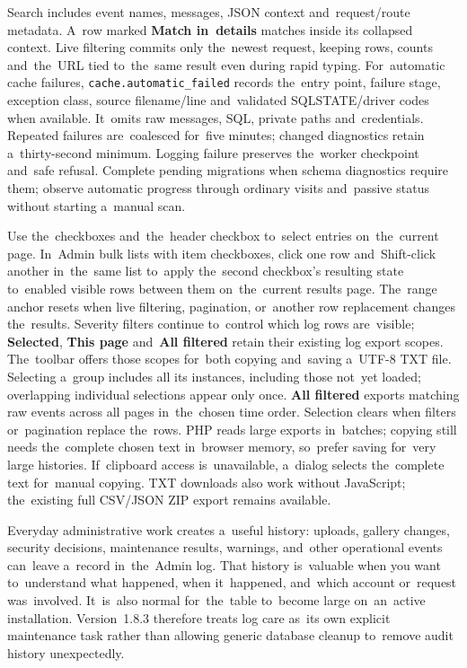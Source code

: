 \documentclass[11pt,a4paper]{article}
\newcommand{\version}{1.8.3}
\newcommand{\ui}[1]{\textbf{#1}}
\newcommand{\codeword}[1]{\nolinkurl{#1}}
\begin{document}
Search includes event names, messages, JSON context and~request/route metadata.
A~row marked \ui{Match in~details} matches inside its collapsed context. Live
filtering commits only the~newest request, keeping rows, counts and~the~URL tied
to~the~same result even during rapid typing. For~automatic cache failures,
\codeword{cache.automatic\_failed} records the~entry point, failure stage,
exception class, source filename/line and~validated SQLSTATE/driver codes when
available. It~omits raw messages, SQL, private paths and~credentials. Repeated
failures are~coalesced for~five minutes; changed diagnostics retain
a~thirty-second minimum. Logging failure preserves the~worker checkpoint
and~safe refusal. Complete pending migrations when schema diagnostics require
them; observe automatic progress through ordinary visits and~passive status
without starting a~manual scan.

Use the~checkboxes and~the~header checkbox to~select entries on~the~current
page. In~Admin bulk lists with item checkboxes, click one row and~Shift-click
another in~the~same list to~apply the~second checkbox's resulting state
to~enabled visible rows between them on~the~current results page. The~range
anchor resets when live filtering, pagination, or~another row replacement
changes the~results. Severity filters continue to~control which log rows
are~visible; \ui{Selected}, \ui{This page} and~\ui{All filtered} retain their
existing log export scopes. The~toolbar offers those scopes for~both copying
and~saving a~UTF-8 TXT file. Selecting a~group includes all its instances,
including those not~yet loaded; overlapping individual selections appear only
once. \ui{All filtered} exports matching raw events across all pages
in~the~chosen time order. Selection clears when filters or~pagination replace
the~rows. PHP reads large exports in~batches; copying still needs the~complete
chosen text in~browser memory, so~prefer saving for~very large histories.
If~clipboard access is~unavailable, a~dialog selects the~complete text
for~manual copying. TXT downloads also work without JavaScript; the~existing
full CSV/JSON ZIP export remains available.

Everyday administrative work creates a~useful history: uploads, gallery changes,
security decisions, maintenance results, warnings, and~other operational events
can~leave a~record in~the~Admin log. That history is~valuable when you want
to~understand what happened, when it~happened, and~which account or~request
was~involved. It~is~also normal for~the~table to~become large on~an~active
installation. Version~\version{} therefore treats log care as~its own explicit
maintenance task rather than allowing generic database cleanup to~remove audit
history unexpectedly.
\end{document}
